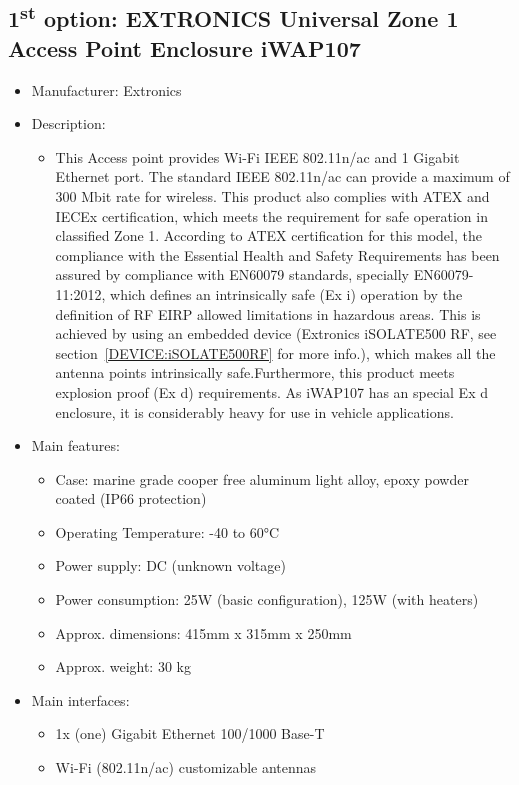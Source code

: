 \subsection{1\textsuperscript{st} option: EXTRONICS Universal Zone 1 Access Point Enclosure iWAP107} \label{DEVICE:iWAP107}
\begin{itemize}
  \item Manufacturer: Extronics
  \item Description:
  \begin{itemize}
    \item This Access point provides Wi-Fi IEEE 802.11n/ac and 1 Gigabit Ethernet port. The standard IEEE 802.11n/ac can provide a maximum of 300 Mbit rate for wireless. This product also complies with ATEX and IECEx certification, which meets the requirement for safe operation in classified Zone 1. According to ATEX certification for this model, the compliance with the Essential Health and Safety Requirements has been assured by compliance with EN60079 standards, specially EN60079-11:2012, which defines an intrinsically safe (Ex i) operation by the definition of RF EIRP allowed limitations in hazardous areas. This is achieved by using an embedded device (Extronics iSOLATE500 RF, see section~\ref{DEVICE:iSOLATE500RF} for more info.), which makes all the antenna points intrinsically safe.Furthermore, this product meets explosion proof (Ex d) requirements. As iWAP107 has an special Ex d enclosure, it is considerably heavy for use in vehicle applications.
  \end{itemize}
  \item Main features:
  \begin{itemize}
    \item Case: marine grade cooper free aluminum light alloy, epoxy powder coated (IP66 protection)
    \item Operating Temperature: -40 to 60°C
    \item Power supply: DC (unknown voltage)
    \item Power consumption: 25W (basic configuration), 125W (with heaters)
    \item Approx. dimensions: 415mm x 315mm x 250mm
    \item Approx. weight: 30 kg
  \end{itemize}
  \item Main interfaces:
  \begin{itemize}
    \item 1x (one) Gigabit Ethernet 100/1000 Base-T
    \item Wi-Fi (802.11n/ac) customizable antennas

\end{itemize}
\end{itemize}
